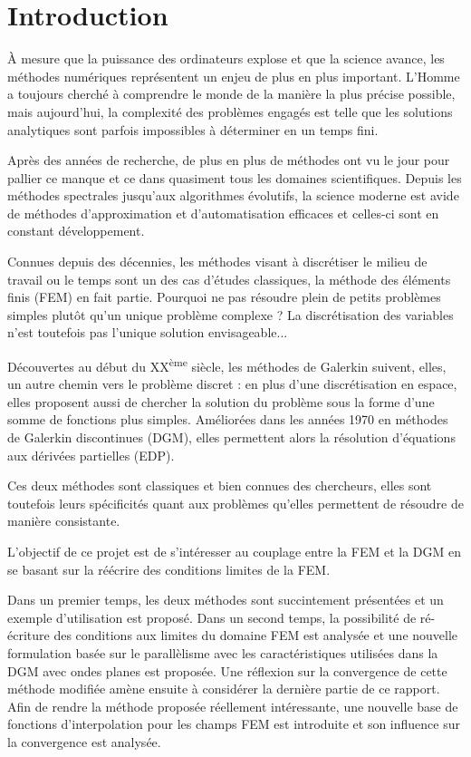 \section*{Introduction}

À mesure que la puissance des ordinateurs explose et que la science avance, les méthodes numériques représentent un
enjeu de plus en plus important. L'Homme a toujours cherché à comprendre le monde de la manière la plus précise
possible, mais aujourd'hui, la complexité des problèmes engagés est telle que les solutions analytiques sont parfois
impossibles à déterminer en un temps fini.

Après des années de recherche, de plus en plus de méthodes ont vu le jour pour pallier ce manque et ce dans quasiment
tous les domaines scientifiques. Depuis les méthodes spectrales jusqu'aux algorithmes évolutifs, la science moderne est
avide de méthodes d'approximation et d'automatisation efficaces et celles-ci sont en constant développement.

Connues depuis des décennies, les méthodes visant à discrétiser le milieu de travail ou le temps sont un des cas
d'études classiques, la méthode des éléments finis (FEM) en fait partie. Pourquoi ne pas résoudre plein de petits problèmes
simples plutôt qu'un unique problème complexe ? La discrétisation des variables n'est toutefois pas l'unique solution
envisageable...

Découvertes au début du XX\textsuperscript{ème} siècle, les méthodes de Galerkin suivent, elles, un autre chemin vers le
problème discret : en plus d'une discrétisation en espace, elles proposent aussi de chercher la solution du problème
sous la forme d'une somme de fonctions plus simples. Améliorées dans les années 1970 en méthodes de Galerkin
discontinues (DGM), elles permettent alors la résolution d'équations aux dérivées partielles (EDP).

Ces deux méthodes sont classiques et bien connues des chercheurs, elles sont toutefois leurs spécificités quant aux
problèmes qu'elles permettent de résoudre de manière consistante.

\bigskip

L'objectif de ce projet est de s'intéresser au couplage entre la FEM et la DGM en se basant sur la réécrire des
conditions limites de la FEM.

Dans un premier temps, les deux méthodes sont succintement présentées et un exemple d'utilisation est proposé.
Dans un second temps, la possibilité de ré-écriture des conditions aux limites du domaine FEM est analysée et une
nouvelle formulation basée sur le parallèlisme avec les caractéristiques utilisées dans la DGM avec ondes planes est
proposée. Une réflexion sur la convergence de cette méthode modifiée amène ensuite à considérer la dernière partie de ce
rapport. Afin de rendre la méthode proposée réellement intéressante, une nouvelle base de fonctions d'interpolation pour
les champs FEM est introduite et son influence sur la convergence est analysée.



